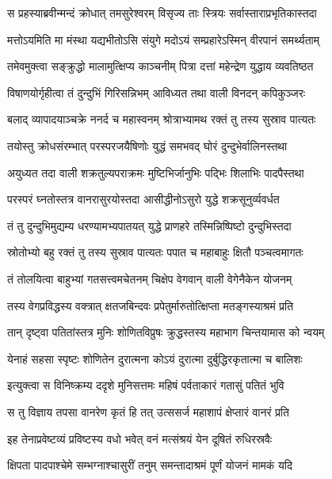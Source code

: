 \twolineshloka
{स प्रहस्याब्रवीन्मन्दं क्रोधात् तमसुरेश्वरम्}
{विसृज्य ताः स्त्रियः सर्वास्ताराप्रभृतिकास्तदा} %

\twolineshloka
{मत्तोऽयमिति मा मंस्था यद्यभीतोऽसि संयुगे}
{मदोऽयं सम्प्रहारेऽस्मिन् वीरपानं समर्थ्यताम्} %

\twolineshloka
{तमेवमुक्त्वा सङ्क्रुद्धो मालामुत्क्षिप्य काञ्चनीम्}
{पित्रा दत्तां महेन्द्रेण युद्धाय व्यवतिष्ठत} %

\twolineshloka
{विषाणयोर्गृहीत्वा तं दुन्दुभिं गिरिसन्निभम्}
{आविध्यत तथा वाली विनदन् कपिकुञ्जरः} %

\twolineshloka
{बलाद् व्यापादयाञ्चक्रे ननर्द च महास्वनम्}
{श्रोत्राभ्यामथ रक्तं तु तस्य सुस्राव पात्यतः} %

\twolineshloka
{तयोस्तु क्रोधसंरम्भात् परस्परजयैषिणोः}
{युद्धं समभवद् घोरं दुन्दुभेर्वालिनस्तथा} %

\twolineshloka
{अयुध्यत तदा वाली शक्रतुल्यपराक्रमः}
{मुष्टिभिर्जानुभिः पद्भिः शिलाभिः पादपैस्तथा} %

\twolineshloka
{परस्परं घ्नतोस्तत्र वानरासुरयोस्तदा}
{आसीद्धीनोऽसुरो युद्धे शक्रसूनुर्व्यवर्धत} %

\twolineshloka
{तं तु दुन्दुभिमुद्यम्य धरण्यामभ्यपातयत्}
{युद्धे प्राणहरे तस्मिन्निष्पिष्टो दुन्दुभिस्तदा} %

\twolineshloka
{स्रोतोभ्यो बहु रक्तं तु तस्य सुस्राव पात्यतः}
{पपात च महाबाहुः क्षितौ पञ्चत्वमागतः} %

\twolineshloka
{तं तोलयित्वा बाहुभ्यां गतसत्त्वमचेतनम्}
{चिक्षेप वेगवान् वाली वेगेनैकेन योजनम्} %

\twolineshloka
{तस्य वेगप्रविद्धस्य वक्त्रात् क्षतजबिन्दवः}
{प्रपेतुर्मारुतोत्क्षिप्ता मतङ्गस्याश्रमं प्रति} %

\twolineshloka
{तान् दृष्ट्वा पतितांस्तत्र मुनिः शोणितविप्रुषः}
{क्रुद्धस्तस्य महाभाग चिन्तयामास को न्वयम्} %

\twolineshloka
{येनाहं सहसा स्पृष्टः शोणितेन दुरात्मना}
{कोऽयं दुरात्मा दुर्बुद्धिरकृतात्मा च बालिशः} %

\twolineshloka
{इत्युक्त्वा स विनिष्क्रम्य ददृशे मुनिसत्तमः}
{महिषं पर्वताकारं गतासुं पतितं भुवि} %

\twolineshloka
{स तु विज्ञाय तपसा वानरेण कृतं हि तत्}
{उत्ससर्ज महाशापं क्षेप्तारं वानरं प्रति} %

\twolineshloka
{इह तेनाप्रवेष्टव्यं प्रविष्टस्य वधो भवेत्}
{वनं मत्संश्रयं येन दूषितं रुधिरस्रवैः} %

\twolineshloka
{क्षिपता पादपाश्चेमे सम्भग्नाश्चासुरीं तनुम्}
{समन्तादाश्रमं पूर्णं योजनं मामकं यदि} %


